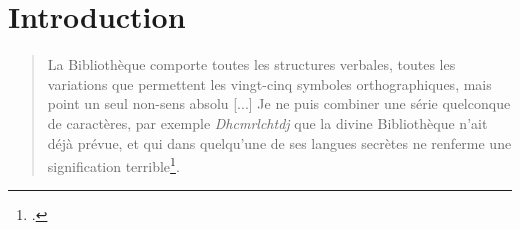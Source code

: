 \chapter{Introduction}	

\begin{quote}
    \og La Bibliothèque comporte toutes les structures verbales, toutes les variations que permettent les vingt-cinq symboles orthographiques, mais point un seul non-sens absolu [...] Je ne puis combiner une série quelconque de caractères, par exemple	\textit{Dhcmrlchtdj} que la divine Bibliothèque n’ait déjà prévue, et qui dans quelqu'une de ses langues secrètes ne renferme
	une signification terrible\footcite{borges_bibliotheque_2011}.\fg
\end{quote}